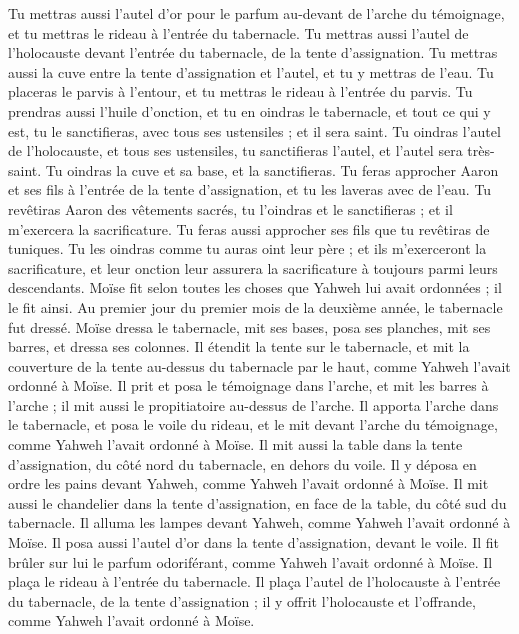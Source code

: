 \begin{multicols}{2}
Tu mettras aussi l'autel d'or pour le parfum au-devant de l'arche du témoignage, et tu mettras le rideau à l'entrée du tabernacle.
Tu mettras aussi l'autel de l'holocauste devant l'entrée du tabernacle, de la tente d'assignation.
Tu mettras aussi la cuve entre la tente d'assignation et l'autel, et tu y mettras de l'eau.
Tu placeras le parvis à l’entour, et tu mettras le rideau à l’entrée du parvis.
Tu prendras aussi l'huile d'onction, et tu en oindras le tabernacle, et tout ce qui y est, tu le sanctifieras, avec tous ses ustensiles ; et il sera saint.
Tu oindras l'autel de l'holocauste, et tous ses ustensiles, tu sanctifieras l'autel, et l'autel sera très-saint.
Tu oindras la cuve et sa base, et la sanctifieras.
Tu feras approcher Aaron et ses fils à l'entrée de la tente d'assignation, et tu les laveras avec de l'eau.
Tu revêtiras Aaron des vêtements sacrés, tu l'oindras et le sanctifieras ; et il m'exercera la sacrificature.
Tu feras aussi approcher ses fils que tu revêtiras de tuniques.
Tu les oindras comme tu auras oint leur père ; et ils m'exerceront la sacrificature, et leur onction leur assurera la sacrificature à toujours parmi leurs descendants.
Moïse fit selon toutes les choses que Yahweh lui avait ordonnées ; il le fit ainsi.
Au premier jour du premier mois de la deuxième année, le tabernacle fut dressé.
Moïse dressa le tabernacle, mit ses bases, posa ses planches, mit ses barres, et dressa ses colonnes.
Il étendit la tente sur le tabernacle, et mit la couverture de la tente au-dessus du tabernacle par le haut, comme Yahweh l'avait ordonné à Moïse.
Il prit et posa le témoignage dans l'arche, et mit les barres à l'arche ; il mit aussi le propitiatoire au-dessus de l'arche.
Il apporta l'arche dans le tabernacle, et posa le voile du rideau, et le mit devant l'arche du témoignage, comme Yahweh l'avait ordonné à Moïse.
Il mit aussi la table dans la tente d'assignation, du côté nord du tabernacle, en dehors du voile.
Il y déposa en ordre les pains devant Yahweh, comme Yahweh l'avait ordonné à Moïse.
Il mit aussi le chandelier dans la tente d'assignation, en face de la table, du côté sud du tabernacle.
Il alluma les lampes devant Yahweh, comme Yahweh l'avait ordonné à Moïse.
Il posa aussi l'autel d'or dans la tente d'assignation, devant le voile.
Il fit brûler sur lui le parfum odoriférant, comme Yahweh l'avait ordonné à Moïse.
Il plaça le rideau à l'entrée du tabernacle.
Il plaça l'autel de l'holocauste à l'entrée du tabernacle, de la tente d'assignation ; il y offrit l'holocauste et l’offrande, comme Yahweh l'avait ordonné à Moïse.

\end{multicols}
